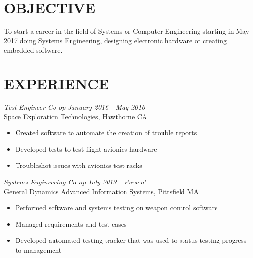 \documentclass[line,margin]{res}
\begin{document}
\setlength\columnsep{-30pt}
\address{CRC3510@RIT.EDU}
\address{(413) 376-5034}
 
\begin{resume}
 \setlength\multicolsep{2pt}

\section{OBJECTIVE}   
	To start a career in the field of Systems or Computer Engineering starting in May 2017 doing Systems Engineering, designing electronic hardware or creating embedded software.
 
\section{EXPERIENCE} 
{\sl  Test Engineer Co-op} \hfill {\sl January 2016 - May 2016}\\
	Space Exploration Technologies, Hawthorne CA
	\begin{itemize}  \itemsep -2pt %
		\item Created software to automate the creation of trouble reports
		\item Developed tests to test flight avionics hardware
		\item Troubleshot issues with avionics test racks
	\end{itemize}
{\sl Systems Engineering Co-op} \hfill {\sl July 2013 - Present }\\
	General Dynamics Advanced Information Systems, Pittsfield MA
	\begin{itemize}  \itemsep -2pt %
		\item Performed software and systems testing on weapon control software
		\item Managed requirements and test cases
		\item Developed automated testing tracker that was used to status testing progress to management
	\end{itemize}
 

\end{resume}
\end{document}

